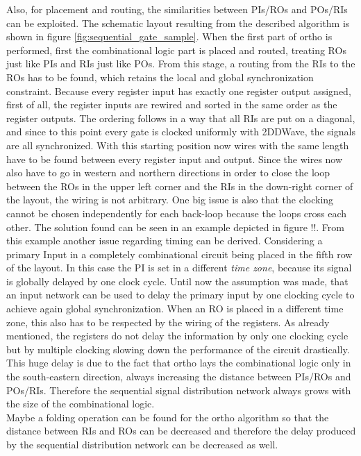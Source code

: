 Also, for placement and routing, the similarities between PIs/ROs and POs/RIs can be exploited. The schematic layout resulting from the described algorithm is shown in figure \ref{fig:sequential_gate_sample}. When the first part of ortho is performed, first the combinational logic part is placed and routed, treating ROs just like PIs and RIs just like POs. From this stage, a routing from the RIs to the ROs has to be found, which retains the local and global synchronization constraint. Because every register input has exactly one register output assigned, first of all, the register inputs are rewired and sorted in the same order as the register outputs. The ordering follows in a way that all RIs are put on a diagonal, and since to this point every gate is clocked uniformly with 2DDWave, the signals are all synchronized. With this starting position now wires with the same length have to be found between every register input and output. Since the wires now also have to go in western and northern directions in order to close the loop between the ROs in the upper left corner and the RIs in the down-right corner of the layout, the wiring is not arbitrary. One big issue is also that the clocking cannot be chosen independently for each back-loop because the loops cross each other. The solution found can be seen in an example depicted in figure !!. From this example another issue regarding timing can be derived. Considering a primary Input in a completely combinational circuit being placed in the fifth row of the layout. In this case the PI is set in a different \textit{time zone}, because its signal is globally delayed by one clock cycle. Until now the assumption was made, that an input network can be used to delay the primary input by one clocking cycle to achieve again global synchronization. When an RO is placed in a different time zone, this also has to be respected by the wiring of the registers. As already mentioned, the registers do not delay the information by only one clocking cycle but by multiple clocking slowing down the performance of the circuit drastically. This huge delay is due to the fact that ortho lays the combinational logic only in the south-eastern direction, always increasing the distance between PIs/ROs and POs/RIs. Therefore the sequential signal distribution network always grows with the size of the combinational logic.\\
Maybe a folding operation can be found for the ortho algorithm so that the distance between RIs and ROs can be decreased and therefore the delay produced by the sequential distribution network can be decreased as well.

